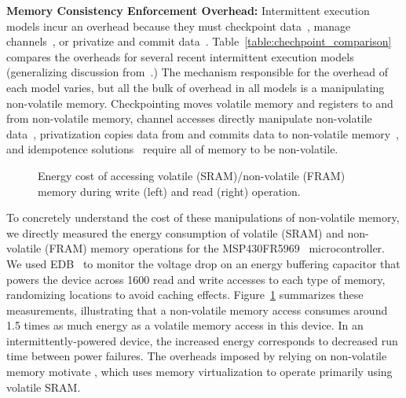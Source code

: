 \noindent \textbf{Memory Consistency Enforcement Overhead:} Intermittent execution models incur an overhead because they must checkpoint data~\cite{dino,ratchet,quickrecall,mementos}, manage channels~\cite{chain}, or privatize and commit data~\cite{alpaca}. Table~\ref{table:chechpoint_comparison} compares the overheads for several recent intermittent execution models (generalizing discussion from~\cite[Sec. 2.4]{alpaca}.) The mechanism responsible for the overhead of each model varies, but all the bulk of overhead in all models is a manipulating non-volatile memory. Checkpointing moves volatile memory and registers to and from non-volatile memory, channel accesses directly manipulate non-volatile data~\cite{chain}, privatization copies data from and commits data to non-volatile memory~\cite{alpaca}, and idempotence solutions~\cite{ratchet} require all of memory to be non-volatile.  

\begin{figure}
	\centering
	\caption{Energy cost of accessing volatile (SRAM)/non-volatile (FRAM) memory during write (left) and read (right) operation.}
	\label{fig:framEnergy}
\end{figure}

To concretely understand the cost of these manipulations of non-volatile memory, we directly measured the energy consumption of volatile (SRAM) and non-volatile (FRAM) memory operations for the MSP430FR5969~\cite{msp430datasheet} microcontroller. We used EDB~\cite{edb} to monitor the voltage drop on an energy buffering capacitor that powers the device across 1600 read and write accesses to each type of memory, randomizing locations to avoid caching effects. Figure~\ref{fig:framEnergy} summarizes these measurements, illustrating that a non-volatile memory access consumes around 1.5 times as much energy as a volatile memory access in this device. In an intermittently-powered device, the increased energy corresponds to decreased run time between power failures. The overheads imposed by relying on non-volatile memory motivate \sys, which uses memory virtualization to operate primarily using volatile SRAM.

